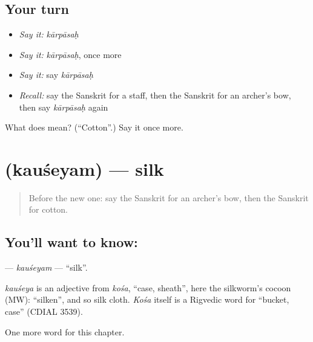 \subsection*{Your turn}
\begin{itemize}
\raggedright
  \item \emph{Say it:} \emph{kārpāsaḥ}
  \item \emph{Say it:} \emph{kārpāsaḥ}, once more
  \item \emph{Say it:} say \emph{kārpāsaḥ}
  \item \emph{Recall:} say the Sanskrit for a staff, then the Sanskrit for an archer's bow, then say \emph{kārpāsaḥ} again
\end{itemize}

\begin{tcolorbox}[breakable,colback=teal!4,colframe=teal!35!black,title={Before you move on}]
What does  mean? (\textquotedblleft{}Cotton\textquotedblright{}.) Say it once more.
\end{tcolorbox}
\section[\texorpdfstring{\sk{कौशेयम्} (kauśeyam)}{कौशेयम् (kauśeyam)}]{ (kauśeyam) — silk}

\label{lesson:SA-C221-kauseyam}



\begin{quote}
Before the new one: say the Sanskrit for an archer's bow, then the Sanskrit for cotton.
\end{quote}

\subsection*{You'll want to know: }
\textbf{} — \emph{kauśeyam} — \textquotedblleft{}silk\textquotedblright{}.

\begin{cousinweb}
\emph{kauśeya} is an adjective from \emph{kośa}, \textquotedblleft{}case, sheath\textquotedblright{}, here the silkworm's cocoon (MW): \textquotedblleft{}silken\textquotedblright{}, and so silk cloth. \emph{Kośa} itself is a Rigvedic word for \textquotedblleft{}bucket, case\textquotedblright{} (CDIAL 3539).
\end{cousinweb}

\begin{grammarlens}[title={What you've built}]
One more word for this chapter.
\end{grammarlens}

